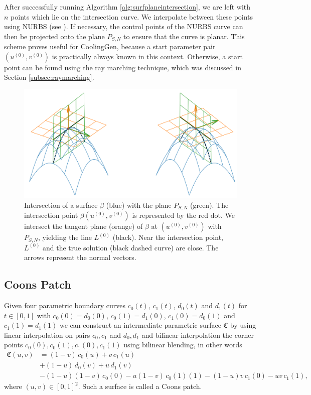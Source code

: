 \documentclass[a4paper, 11pt]{report}
\theoremstyle{definition}
\begin{document}
	After successfully running Algorithm \ref{alg:surfplaneintersection}, we are left with $n$ points which lie on the intersection curve. We interpolate between these points using NURBS (see \cite{Piegl1997}). If necessary, the control points of the NURBS curve can then be projected onto the plane $P_{S,N}$ to ensure that the curve is planar. This scheme proves useful for CoolingGen, because a start parameter pair $(u^{(0)}, v^{(0)})$ is practically always known in this context. Otherwise, a start point can be found using the ray marching technique, which was discussed in Section \ref{subsec:raymarching}.

	\begin{figure}[H]
		\centering
		\includegraphics[width=.8\textwidth]{../python/surfacePlaneIntersection2_cropped.png}
		\caption{Intersection of a surface $\beta$ (blue) with the plane $P_{S,N}$ (green). The intersection point $\beta(u^{(0)}, v^{(0)})$ is represented by the red dot. We intersect the tangent plane (orange) of $\beta$ at $(u^{(0)}, v^{(0)})$ with $P_{S,N}$, yielding the line $L^{(0)}$ (black). Near the intersection point, $L^{(0)}$ and the true solution (black dashed curve) are close. The arrows represent the normal vectors.}
		\label{fig:planeintersectionline}
	\end{figure}

\subsection{Coons Patch}
	Given four parametric boundary curves $c_0(t)$, $c_1(t)$, $d_0(t)$ and $d_1(t)$ for $t \in [0,1]$ with $c_0(0) = d_0(0)$, $c_0(1) = d_1(0)$, $c_1(0) = d_0(1)$ and $c_1(1) = d_1(1)$ we can construct an intermediate parametric surface $\mathfrak{C}$ by using linear interpolation on pairs $c_0, c_1$ and $d_0, d_1$ and bilinear interpolation the corner points $c_0(0), c_0(1), c_1(0), c_1(1)$ using bilinear blending, in other words
	\begin{align*}
		\mathfrak{C}(u,v) 	&= (1-v)\,c_0(u) + v\,c_1(u) \\
				&+ (1-u)\,d_0(v) + u\,d_1(v) \\
				&- (1-u)(1-v)\,c_0(0) - u(1-v)\,c_0(1)(1) - (1-u)v\,c_1(0) - uv\,c_1(1),
	\end{align*}
	where $(u,v) \in [0,1]^2$. Such a surface is called a Coons patch. 
\end{document}

